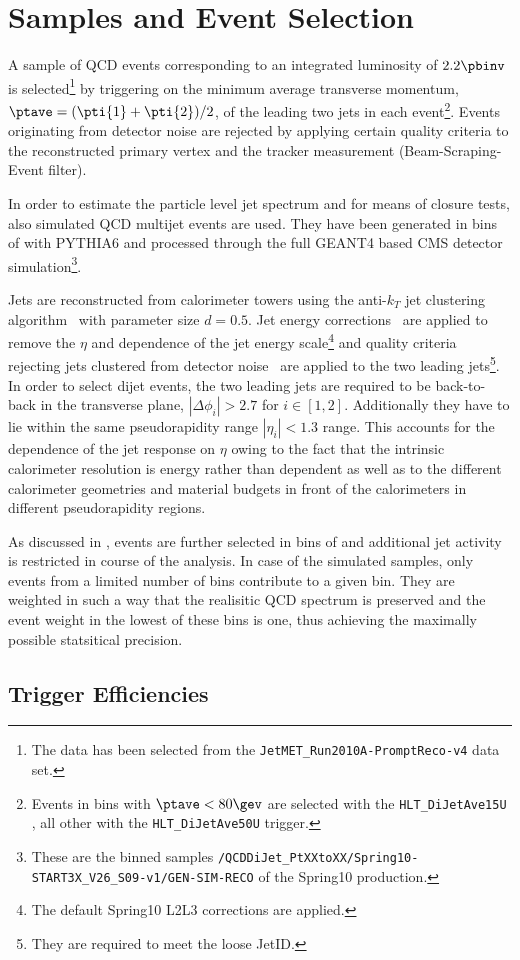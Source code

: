\section{Samples and Event Selection}

A sample of QCD events corresponding to an integrated luminosity of $2.2\pbinv$ is
selected\footnote{The data has been selected from the \texttt{JetMET\_Run2010A-PromptReco-v4} data set.} by triggering on the minimum average transverse momentum, \mbox{$\ptave = (\pti{1} + \pti{2})/2$}, of the leading two jets in each event\footnote{Events in bins with \mbox{$\ptave < 80\gev$} are selected with the \texttt{HLT\_DiJetAve15U} , all other with the \texttt{HLT\_DiJetAve50U} trigger.}.
Events originating from detector noise are rejected by applying certain quality criteria to the reconstructed primary vertex and the tracker measurement (Beam-Scraping-Event filter).

In order to estimate the particle level jet \pt spectrum and for means of closure tests, also simulated QCD multijet events are used.
They have been generated in bins of \pthat with PYTHIA6 and processed through the full GEANT4 based CMS detector simulation\footnote{These are the \pthat binned samples \texttt{/QCDDiJet\_PtXXtoXX/Spring10-START3X\_V26\_S09-v1/GEN-SIM-RECO} of the Spring10 production.}.

Jets are reconstructed from calorimeter towers using the
anti-$k_{T}$ jet clustering algorithm~\cite{bib:akj} with parameter size \mbox{$d=0.5$}.
Jet energy corrections~\cite{bib:cmspas:jec} are applied to remove the 
$\eta$ and \pt dependence of the jet energy scale\footnote{The default Spring10 L2L3 corrections are applied.} and quality criteria rejecting jets clustered from detector noise~\cite{bib:cmspas:jetid} are applied to the
two leading jets\footnote{They are required to meet the loose JetID.}.
In order to select dijet events, the two leading jets are required to be
back-to-back in the transverse plane, \mbox{$|\Delta\phi_{i}| > 2.7$} for \mbox{$i \in [1,2]$}.
Additionally they have to lie within the same pseudorapidity range \mbox{$|\eta_{i}| < 1.3$} range.
This accounts for the dependence of the jet \pt response on $\eta$ owing to the fact that the intrinsic calorimeter resolution is energy rather than \pt dependent as well as to the different calorimeter geometries and material budgets in front of the calorimeters in different pseudorapidity regions.

As discussed in , events are further selected in bins of \ptave and additional
jet activity is restricted in course of the analysis.
In case of the simulated samples, only events from a limited number of \pthat bins contribute to a given \ptave bin.
They are weighted in such a way that the realisitic QCD \pt spectrum is preserved and the event weight in the lowest of these \pthat bins is one, thus achieving the maximally possible statsitical precision.


\subsection{Trigger Efficiencies}